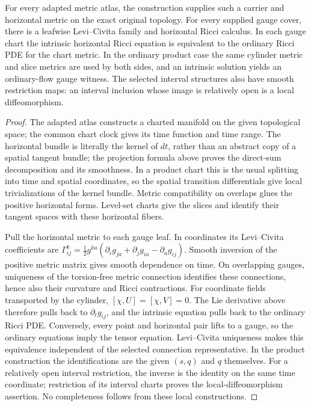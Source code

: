 \begin{theorem}
\label{thm:m11-m12-gauge}
For every adapted metric atlas, the construction supplies such a carrier and
horizontal metric on the exact original topology.  For every supplied gauge
cover, there is a leafwise Levi--Civita family and horizontal Ricci calculus.
In each gauge chart the intrinsic horizontal Ricci equation is equivalent to
the ordinary Ricci PDE for the chart metric.  In the ordinary product case the
same cylinder metric and slice metrics are used by both sides, and an intrinsic
solution yields an ordinary-flow gauge witness.  The selected interval
structures also have smooth restriction maps: an interval inclusion whose
image is relatively open is a local diffeomorphism.
\cite[Definitions 3.34--3.36 and Remark 3.37, pp. 59--60]{MT2007}
\end{theorem}
\begin{proof}
The adapted atlas constructs a charted manifold on the given topological
space; the common chart clock gives its time function and time range.
The horizontal bundle is literally
the kernel of $dt$, rather than an abstract copy of a spatial tangent bundle;
the projection formula above proves the direct-sum decomposition and its
smoothness.  In a product chart this is the usual splitting into time and
spatial coordinates, so the spatial transition differentials give local
trivializations of the kernel bundle.  Metric compatibility on overlaps
glues the positive horizontal forms.  Level-set charts give the slices and
identify their tangent spaces with these horizontal fibers.

Pull the horizontal metric to each gauge leaf.  In coordinates its
Levi--Civita coefficients are
$\Gamma^k_{ij}=\tfrac12g^{ka}(\partial_i g_{ja}+\partial_j g_{ia}
-\partial_a g_{ij})$.  Smooth inversion of the positive metric matrix
gives smooth dependence on time.  On overlapping gauges, uniqueness of the
torsion-free metric connection identifies these connections, hence also
their curvature and Ricci contractions.  For coordinate fields transported
by the cylinder, $[\chi,U]=[\chi,V]=0$.  The Lie derivative above therefore
pulls back to $\partial_tg_{ij}$, and the intrinsic equation pulls back
to the ordinary Ricci PDE.  Conversely, every point and horizontal pair
lifts to a gauge, so the ordinary equations imply the tensor equation.
Levi--Civita uniqueness makes this equivalence independent of the selected
connection representative.  In the product construction the identifications
are the given $(s,q)$ and $q$ themselves.  For a relatively open interval
restriction, the inverse is the identity on the same time coordinate;
restriction of its interval charts proves the local-diffeomorphism assertion.
No completeness follows from these local constructions.
\end{proof}

